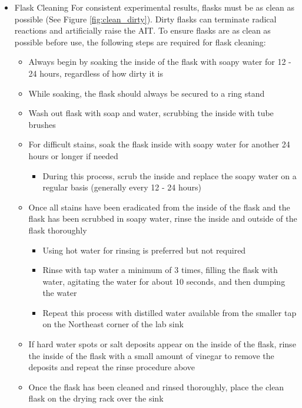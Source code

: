 \documentclass[letterpaper,11pt]{article}
\begin{document}
\begin{itemize}
    \item Flask Cleaning \newline
        For consistent experimental results, flasks must be as clean as possible
        (See Figure \ref{fig:clean_dirty}). Dirty flasks can terminate radical 
        reactions and artificially raise the AIT. To ensure flasks are as clean 
        as possible before use, the following steps are required for flask 
        cleaning:
        \begin{itemize}
        \item Always begin by soaking the inside of the flask with soapy water 
            for 12 - 24 hours, regardless of how dirty it is
        \item While soaking, the flask should always be secured to a ring stand
        \item Wash out flask with soap and water, scrubbing the inside with 
            tube brushes
        \item For difficult stains, soak the flask inside with soapy water for 
            another 24 hours or longer if needed 
            \begin{itemize}
            \item During this process, scrub the inside and replace the 
                soapy water on a regular basis (generally every 12 - 24 hours)
            \end{itemize}
        
        \item Once all stains have been eradicated from the inside of the flask
            and the flask has been scrubbed in soapy water, rinse the inside and
            outside of the flask thoroughly
            \begin{itemize}
            \item Using hot water for rinsing is preferred but not required
            \item Rinse with tap water a minimum of 3 times, filling the flask
                with water, agitating the water for about 10 seconds, and then 
                dumping the water
            \item Repeat this process with distilled water available from the 
                smaller tap on the Northeast corner of the lab sink
            \end{itemize}
        
        \item If hard water spots or salt deposits appear on the inside of the 
            flask, rinse the inside of the flask with a small amount of vinegar
            to remove the deposits and repeat the rinse procedure above
        \item Once the flask has been cleaned and rinsed thoroughly, place the 
            clean flask on the drying rack over the sink
        \end{itemize}        
    \end{itemize}
\end{document}
